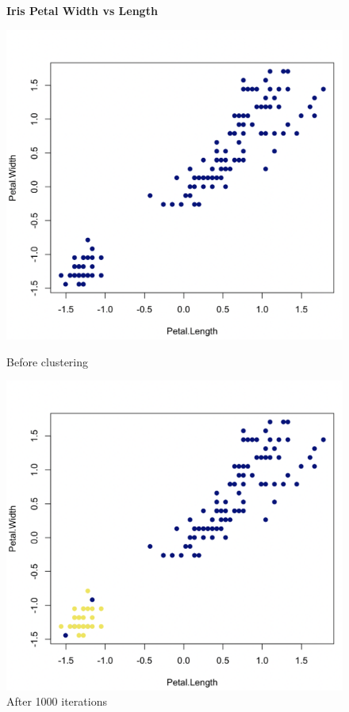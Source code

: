 \documentclass[12pt,a4paper]{article}
\begin{document}
\begin{figure} [H]
    \centering
    \textbf{Iris Petal Width vs Length}\par\medskip
    \begin{minipage}{.5\textwidth}
      \centering
      \includegraphics[width=0.8\linewidth]{petal_before.png}
      \caption{Before clustering}
      \label{fig:petal before clustering}
    \end{minipage}%
    \begin{minipage}{.5\textwidth}
      \centering
      \includegraphics[width=0.8\linewidth]{petal_after.png}
      \caption{After 1000 iterations}
      \label{fig:petal after clustering}
    \end{minipage}
\end{figure}
\end{document}
